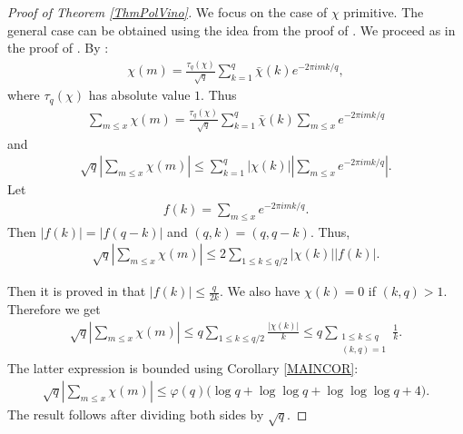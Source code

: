 \documentclass[a4paper]{amsart}
\newcommand{\1}{\mathbbm{1}}
\begin{document}
\begin{proof}[Proof of Theorem \ref{ThmPolVino}]
We focus on the case of $\chi$ primitive. The general case can be obtained using the idea from the proof of \cite[Theorem 13.15]{Apostol}. We proceed as in the proof of \cite[Theorem 8.21]{Apostol}. By \cite[Theorem 8.20]{Apostol}:
\begin{align*}
\chi (m)=\frac{\tau_{q}(\chi)}{\sqrt{q}}\sum_{k=1}^{q}\bar{\chi}(k)e^{-2\pi imk/q},
\end{align*}
where $\tau_{q}(\chi)$ has absolute value $1$. Thus
\begin{align*}
\sum_{m\leq x}\chi (m)=\frac{\tau_{q}(\chi)}{\sqrt{q}}\sum_{k=1}^{q}\bar{\chi}(k)\sum_{m\leq x}e^{-2\pi imk/q}
\end{align*}
and
\begin{align*}
\sqrt{q}\left|\sum_{m\leq x}\chi (m)\right| \leq \sum_{k=1}^{q}|\chi(k)|\left|\sum_{m\leq x}e^{-2\pi imk/q}\right|.
\end{align*}
Let 
\begin{align*}
f(k)=\sum_{m\leq x}e^{-2\pi imk/q}.
\end{align*}
Then $|f(k)|=|f(q-k)|$ and $(q,k)=(q,q-k)$. Thus,
\begin{align*}
\sqrt{q}\left|\sum_{m\leq x}\chi (m)\right| \leq 2\sum_{1\leq k\leq q/2}|\chi(k)||f(k)|.
\end{align*}

Then it is proved in \cite{Apostol} that $|f(k)|\leq \frac{q}{2k}$. We also have $\chi (k)=0$ if $(k,q)>1$. Therefore we get
\begin{align*}
\sqrt{q}\left|\sum_{m\leq x}\chi (m)\right|\leq q\sum_{1\leq k\leq q/2}\frac{|\chi(k)|}{k}\leq q\sum_{\substack{1\leq k\leq q \\ (k,q)=1}}\frac{1}{k}.
\end{align*}
The latter expression is bounded using Corollary \ref{MAINCOR}:
\begin{align*}
\sqrt{q}\left|\sum_{m\leq x}\chi (m)\right|\leq \varphi (q)\big(\log q + \log\log q + \log\log\log q +4\big).
\end{align*}
The result follows after dividing both sides by $\sqrt{q}$.
\end{proof}
\end{document}
